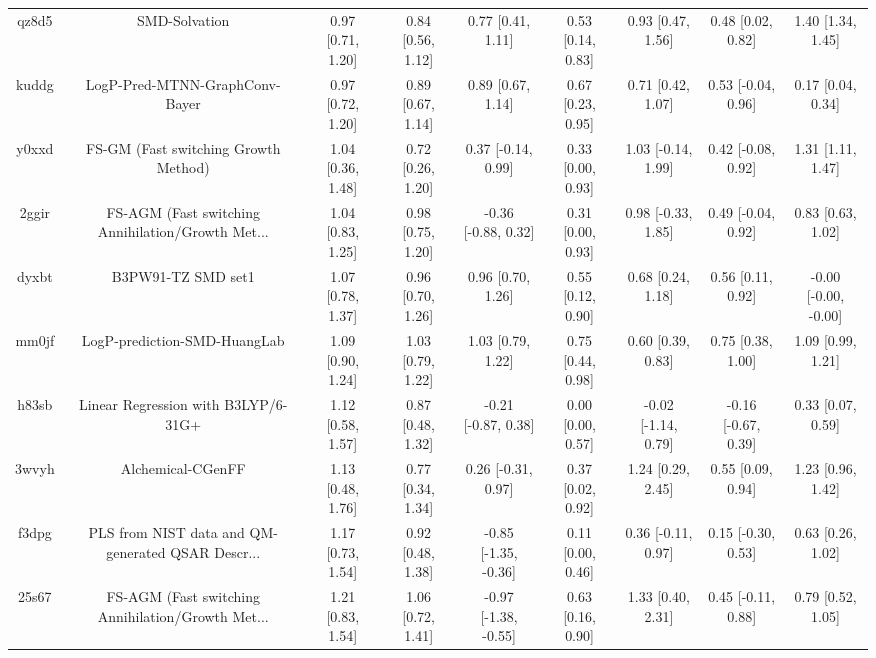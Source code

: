 \documentclass{article}
\begin{document}
\begin{center}
\begin{longtable}{|ccccccccc|}
 qz8d5 &                                      SMD-Solvation &  0.97 [0.71, 1.20] &  0.84 [0.56, 1.12] &     0.77 [0.41, 1.11] &  0.53 [0.14, 0.83] &    0.93 [0.47, 1.56] &    0.48 [0.02, 0.82] &     1.40 [1.34, 1.45] \\
 kuddg &                     LogP-Pred-MTNN-GraphConv-Bayer &  0.97 [0.72, 1.20] &  0.89 [0.67, 1.14] &     0.89 [0.67, 1.14] &  0.67 [0.23, 0.95] &    0.71 [0.42, 1.07] &   0.53 [-0.04, 0.96] &     0.17 [0.04, 0.34] \\
 y0xxd &               FS-GM (Fast switching Growth Method) &  1.04 [0.36, 1.48] &  0.72 [0.26, 1.20] &    0.37 [-0.14, 0.99] &  0.33 [0.00, 0.93] &   1.03 [-0.14, 1.99] &   0.42 [-0.08, 0.92] &     1.31 [1.11, 1.47] \\
 2ggir &  FS-AGM (Fast switching Annihilation/Growth Met... &  1.04 [0.83, 1.25] &  0.98 [0.75, 1.20] &   -0.36 [-0.88, 0.32] &  0.31 [0.00, 0.93] &   0.98 [-0.33, 1.85] &   0.49 [-0.04, 0.92] &     0.83 [0.63, 1.02] \\
 dyxbt &                                 B3PW91-TZ SMD set1 &  1.07 [0.78, 1.37] &  0.96 [0.70, 1.26] &     0.96 [0.70, 1.26] &  0.55 [0.12, 0.90] &    0.68 [0.24, 1.18] &    0.56 [0.11, 0.92] &  -0.00 [-0.00, -0.00] \\
 mm0jf &                       LogP-prediction-SMD-HuangLab &  1.09 [0.90, 1.24] &  1.03 [0.79, 1.22] &     1.03 [0.79, 1.22] &  0.75 [0.44, 0.98] &    0.60 [0.39, 0.83] &    0.75 [0.38, 1.00] &     1.09 [0.99, 1.21] \\
 h83sb &                Linear Regression with B3LYP/6-31G+ &  1.12 [0.58, 1.57] &  0.87 [0.48, 1.32] &   -0.21 [-0.87, 0.38] &  0.00 [0.00, 0.57] &  -0.02 [-1.14, 0.79] &  -0.16 [-0.67, 0.39] &     0.33 [0.07, 0.59] \\
 3wvyh &                                  Alchemical-CGenFF &  1.13 [0.48, 1.76] &  0.77 [0.34, 1.34] &    0.26 [-0.31, 0.97] &  0.37 [0.02, 0.92] &    1.24 [0.29, 2.45] &    0.55 [0.09, 0.94] &     1.23 [0.96, 1.42] \\
 f3dpg &  PLS from NIST data and QM-generated QSAR Descr... &  1.17 [0.73, 1.54] &  0.92 [0.48, 1.38] &  -0.85 [-1.35, -0.36] &  0.11 [0.00, 0.46] &   0.36 [-0.11, 0.97] &   0.15 [-0.30, 0.53] &     0.63 [0.26, 1.02] \\
 25s67 &  FS-AGM (Fast switching Annihilation/Growth Met... &  1.21 [0.83, 1.54] &  1.06 [0.72, 1.41] &  -0.97 [-1.38, -0.55] &  0.63 [0.16, 0.90] &    1.33 [0.40, 2.31] &   0.45 [-0.11, 0.88] &     0.79 [0.52, 1.05] \\

\end{longtable}
\end{center}
\end{document}
